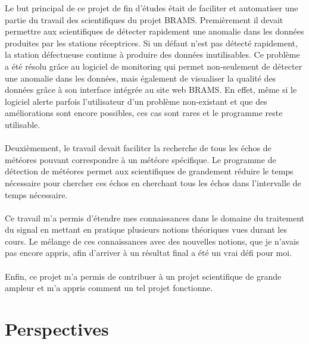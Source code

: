 \documentclass[11pt]{article}
\begin{document}
Le but principal de ce projet de fin d'études était de faciliter et automatiser une partie du travail des scientifiques du projet BRAMS.
Premièrement il devait permettre aux scientifiques de détecter rapidement une anomalie dans les données produites par les stations réceptrices.
Si un défaut n'est pas détecté rapidement, la station défectueuse continue à produire des données inutilisables.
Ce problème a été résolu grâce au logiciel de monitoring qui permet non-seulement de détecter une anomalie dans les données, mais également de visualiser la qualité des données grâce à son interface intégrée au site web BRAMS.
En effet, même si le logiciel alerte parfois l'utilisateur d'un problème non-existant et que des améliorations sont encore possibles, ces cas sont rares et le programme reste utilisable.\\
\\
Deuxièmement, le travail devait faciliter la recherche de tous les échos de météores pouvant correspondre à un météore spécifique.
Le programme de détection de météores permet aux scientifiques de grandement réduire le temps nécessaire pour chercher ces échos en cherchant tous les échos dans l'intervalle de temps nécessaire.\\
\\
Ce travail m'a permis d'étendre mes connaissances dans le domaine du traitement du signal en mettant en pratique plusieurs notions théoriques vues durant les cours.
Le mélange de ces connaissances avec des nouvelles notions, que je n'avais pas encore appris, afin d'arriver à un résultat final a été un vrai défi pour moi.\\
\\
Enfin, ce projet m'a permis de contribuer à un projet scientifique de grande ampleur et m'a appris comment un tel projet fonctionne.

\newpage

\section{Perspectives}
\end{document}
